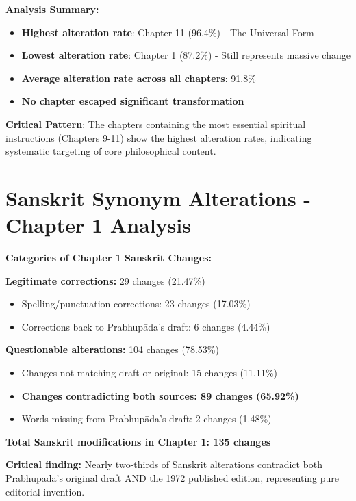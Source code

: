 \documentclass[11pt,twoside]{book}
\begin{document}
\normalsize

\textbf{\textbf{Analysis Summary:}}
\begin{itemize}
\item \textbf{\textbf{Highest alteration rate}}: Chapter 11 (96.4\%) - The Universal Form
\item \textbf{\textbf{Lowest alteration rate}}: Chapter 1 (87.2\%) - Still represents massive change
\item \textbf{\textbf{Average alteration rate across all chapters}}: 91.8\%
\item \textbf{\textbf{No chapter escaped significant transformation}}
\end{itemize}

\textbf{\textbf{Critical Pattern}}: The chapters containing the most essential spiritual instructions (Chapters 9-11) show the highest alteration rates, indicating systematic targeting of core philosophical content.
\section*{Sanskrit Synonym Alterations - Chapter 1 Analysis}
\label{sec:orgbb82e5e}

\textbf{\textbf{Categories of Chapter 1 Sanskrit Changes:}}

\textbf{\textbf{Legitimate corrections:}} 29 changes (21.47\%)
\begin{itemize}
\item Spelling/punctuation corrections: 23 changes (17.03\%)
\item Corrections back to Prabhupāda's draft: 6 changes (4.44\%)
\end{itemize}

\textbf{\textbf{Questionable alterations:}} 104 changes (78.53\%)  
\begin{itemize}
\item Changes not matching draft or original: 15 changes (11.11\%)
\item \textbf{\textbf{Changes contradicting both sources: 89 changes (65.92\%)}}
\item Words missing from Prabhupāda's draft: 2 changes (1.48\%)
\end{itemize}

\textbf{\textbf{Total Sanskrit modifications in Chapter 1: 135 changes}}

\textbf{\textbf{Critical finding:}} Nearly two-thirds of Sanskrit alterations contradict both Prabhupāda's original draft AND the 1972 published edition, representing pure editorial invention.
\end{document}
